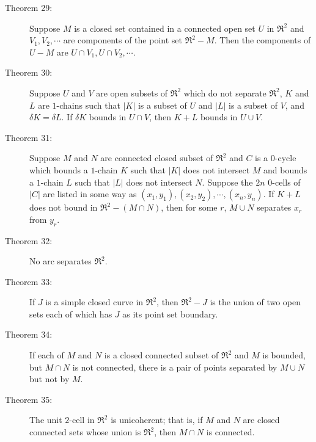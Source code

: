 \documentclass{article}
\begin{document}
\begin{description}
  \item[Theorem 29:] Suppose $M$ is a closed set contained in a connected open set $U$ in $\Re^2$ and $V_1, V_2, \cdots$ are components of the point set $\Re^2-M$. Then the components of $U-M$ are $U \cap V_1, U \cap V_2, \cdots$.

  \item[Theorem 30:] Suppose $U$ and $V$ are open subsets of $\Re^2$ which do not separate $\Re^2$, $K$ and $L$ are $1$-chains such that $|K|$ is a subset of $U$ and $|L|$ is a subset of $V$, and $\delta K = \delta L$. If $\delta K$ bounds in $U \cap V$, then $K+L$ bounds in $U \cup V$.

  \item[Theorem 31:] Suppose $M$ and $N$ are connected closed subset of $\Re^2$ and $C$ is a $0$-cycle which bounds a $1$-chain $K$ such that $|K|$ does not intersect $M$ and bounds a $1$-chain $L$ such that $|L|$ does not intersect $N$. Suppose the $2n$ $0$-cells of $|C|$ are listed in some way as $(x_1,y_1), (x_2,y_2), \cdots, (x_n,y_n)$. If $K+L$ does not bound in $\Re^2-(M \cap N)$, then for some $r$, $M \cup N$ separates $x_r$ from $y_r$.

  \item[Theorem 32:] No arc separates $\Re^2$.

  \item[Theorem 33:] If $J$ is a simple closed curve in $\Re^2$, then $\Re^2-J$ is the union of two open sets each of which has $J$ as its point set boundary.

  \item[Theorem 34:] If each of $M$ and $N$ is a closed connected subset of $\Re^2$ and $M$ is bounded, but $M \cap N$ is not connected, there is a pair of points separated by $M \cup N$ but not by $M$.

  \item[Theorem 35:] The unit $2$-cell in $\Re^2$ is unicoherent; that is, if $M$ and $N$ are closed connected sets whose union is $\Re^2$, then $M \cap N$ is connected.

\end{description}
\end{document}
